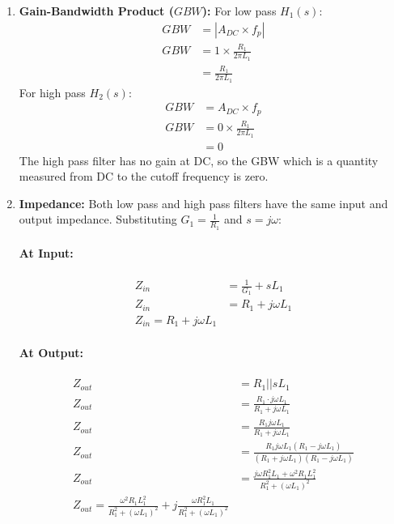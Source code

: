 \begin{enumerate}
\begin{align*}
        A_{DC_2} = 0 = -\infty dB
      \end{align*}
      Zero DC gain for \(H_2(s)\).
    \item \textbf{Gain-Bandwidth Product (\(GBW\)):}
      For low pass \(H_1(s)\):
      \begin{align*}
        GBW &= |A_{DC} \times f_p| \\
        GBW &= 1 \times \frac{R_1}{2 \pi L_1} \\
            &= \frac{R_1}{2 \pi L_1}
      \end{align*}
      For high pass \(H_2(s)\):
      \begin{align*}
        GBW &= A_{DC} \times f_p \\
        GBW &= 0 \times \frac{R_1}{2 \pi L_1} \\
            &= 0
      \end{align*}
      The high pass filter has no gain at DC, so the GBW which
      is a quantity measured from DC to the cutoff frequency is
      zero.
    \item \textbf{Impedance:}
      Both low pass and high pass filters have the same input
      and output impedance.
      Substituting \(G_1 = \frac{1}{R_1}\) and \(s = j \omega\):
      \paragraph{At Input:}
        \begin{align*}
          Z_{in} &= \frac{1}{G_1} + s L_1 \\
          Z_{in} &= R_1 + j \omega L_1 \\
          Z_{in} = R_1 + j \omega L_1
        \end{align*}
      \paragraph{At Output:}
        \begin{align*}
          Z_{out} &= R_1 || s L_1 \\
          Z_{out} &= \frac{R_1 \cdot j \omega L_1}{R_1 + j \omega L_1} \\
          Z_{out} &= \frac{R_1 j \omega L_1}{R_1 + j \omega L_1} \\
          Z_{out} &= \frac{R_1 j \omega L_1 (R_1 - j \omega L_1)}{(R_1 + j \omega L_1)(R_1 - j \omega L_1)} \\
          Z_{out} &= \frac{j \omega R_1^2 L_1 + \omega^2 R_1 L_1^2}{R_1^2 + (\omega L_1)^2} \\
          Z_{out} = \frac{\omega^2 R_1 L_1^2}{R_1^2 + (\omega L_1)^2} + j \frac{\omega R_1^2 L_1}{R_1^2 + (\omega L_1)^2}
        \end{align*}
\end{enumerate}

